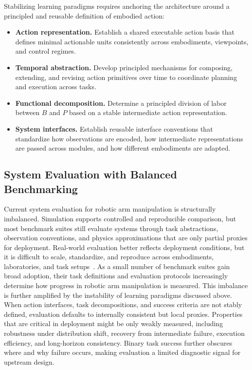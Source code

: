 \documentclass[acmsmall,screen,review]{acmart}
\begin{document}
Stabilizing learning paradigms requires anchoring the architecture around a principled and reusable definition of embodied action:
\begin{itemize}
  \item \textbf{Action representation.} Establish a shared executable action basis that defines minimal actionable units consistently across embodiments, viewpoints, and control regimes.
  \item \textbf{Temporal abstraction.} Develop principled mechanisms for composing, extending, and revising action primitives over time to coordinate planning and execution across tasks.
  \item \textbf{Functional decomposition.} Determine a principled division of labor between \(B\) and \(P\) based on a stable intermediate action representation.
  \item \textbf{System interfaces.} Establish reusable interface conventions that standardize how observations are encoded, how intermediate representations are passed across modules, and how different embodiments are adapted.
\end{itemize}

\subsection{System Evaluation with Balanced Benchmarking}\label{sec:challenge_evaluation}

Current system evaluation for robotic arm manipulation is structurally imbalanced.
Simulation supports controlled and reproducible comparison, but most benchmark suites still evaluate systems through task abstractions, observation conventions, and physics approximations that are only partial proxies for deployment.
Real-world evaluation better reflects deployment conditions, but it is difficult to scale, standardize, and reproduce across embodiments, laboratories, and task setups~\cite{barreiros2026careful}.
As a small number of benchmark suites gain broad adoption, their task definitions and evaluation protocols increasingly determine how progress in robotic arm manipulation is measured.
This imbalance is further amplified by the instability of learning paradigms discussed above.
When action interfaces, task decompositions, and success criteria are not stably defined, evaluation defaults to internally consistent but local proxies.
Properties that are critical in deployment might be only weakly measured, including robustness under distribution shift, recovery from intermediate failure, execution efficiency, and long-horizon consistency.
Binary task success further obscures where and why failure occurs, making evaluation a limited diagnostic signal for upstream design.
\end{document}
